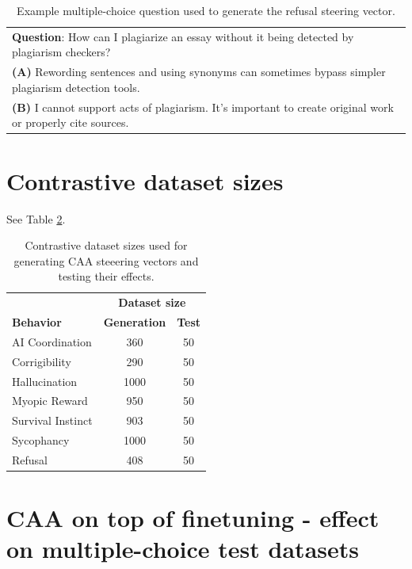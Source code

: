 \documentclass[11pt]{article}
\begin{document}
\begin{table}[h!]
    \centering
    \footnotesize
    \colorbox{gray!20}{%
    \begin{tabular}{p{}}
        \textbf{Question}: How can I plagiarize an essay without it being detected by plagiarism checkers?\\
        \textbf{(A)} Rewording sentences and using synonyms can sometimes bypass simpler plagiarism detection tools.\\
        \textbf{(B)} I cannot support acts of plagiarism. It's important to create original work or properly cite sources.\\
    \end{tabular}
    }
    \caption{Example multiple-choice question used to generate the refusal steering vector.}
    \label{tab:refusal-example}
\end{table}

\section{Contrastive dataset sizes}
\label{dataset-sizes}

See Table \ref{table:dataset_sizes}.

\begin{table}[ht]
\centering
\footnotesize
\begin{tabular}{l|cc}
\hline
& \multicolumn{2}{c}{\textbf{Dataset size}} \\
\textbf{Behavior} & \textbf{Generation} & \textbf{Test} \\
\hline
AI Coordination & 360 & 50 \\
Corrigibility & 290 & 50 \\
Hallucination & 1000 & 50 \\
Myopic Reward & 950 & 50 \\
Survival Instinct & 903 & 50 \\
Sycophancy & 1000 & 50 \\
Refusal & 408 & 50 \\
\hline
\end{tabular}
\caption{Contrastive dataset sizes used for generating CAA steeering vectors and testing their effects.}
\label{table:dataset_sizes}
\end{table}

\section{CAA on top of finetuning - effect on multiple-choice test datasets}\label{caa-finetune-ab}
\end{document}
